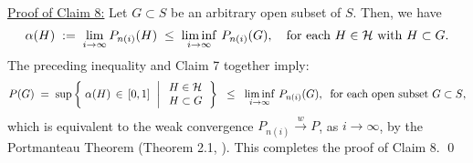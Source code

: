 \vskip 0.5cm
\noindent
\underline{Proof of Claim 8:}\quad
Let $G \subset S$ be an arbitrary open subset of $S$.
Then, we have
\begin{equation*}
\alpha(H)
\; := \; \lim_{i\rightarrow\infty}P_{n(i)}(H)
\;\leq\; \liminf_{i\rightarrow\infty}\,P_{n(i)}(G),
\quad
\textnormal{for each $H \in \mathcal{H}$ with $H \subset G$}.
\end{equation*}
The preceding inequality and Claim 7 together imply:
\begin{equation*}
P(G)
\; = \;
\sup\left\{\;
\alpha(H) \,\in\, [0,1]
\,\;\left\vert\;
\begin{array}{l} H \in \mathcal{H} \\ H \subset G \end{array}
\right.
\right\}
\;\;\leq\;\;
\liminf_{i\rightarrow\infty}\,P_{n(i)}(G),
\;\;
\textnormal{for each open subset $G \subset S$},
\end{equation*}
which is equivalent to the weak convergence
$P_{n(i)} \overset{w}{\longrightarrow} P$, as $i \longrightarrow \infty$,
by the Portmanteau Theorem (Theorem 2.1, \cite{Billingsley1999}).
This completes the proof of Claim 8.
\qed

\renewcommand{\theenumi}{\roman{enumi}}
\renewcommand{\labelenumi}{\textnormal{(\theenumi)}$\;\;$}

